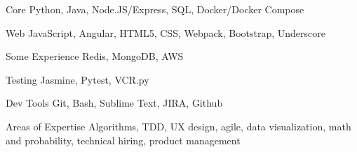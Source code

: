 

\begin{cvskills}

  \cvskill
    {Core}
    {Python, Java, Node.JS/Express, SQL, Docker/Docker Compose}

  \cvskill
    {Web}
    {JavaScript, Angular, HTML5, CSS, Webpack, Bootstrap, Underscore}

  \cvskill
    {Some Experience}
    {Redis, MongoDB, AWS}

  \cvskill
    {Testing}
    {Jasmine, Pytest, VCR.py}

  \cvskill
    {Dev Tools}
    {Git, Bash, Sublime Text, JIRA, Github}

  \cvskill
    {Areas of Expertise}
    {Algorithms, TDD, UX design, agile, data visualization, math and probability, technical hiring, product management}

\end{cvskills}
